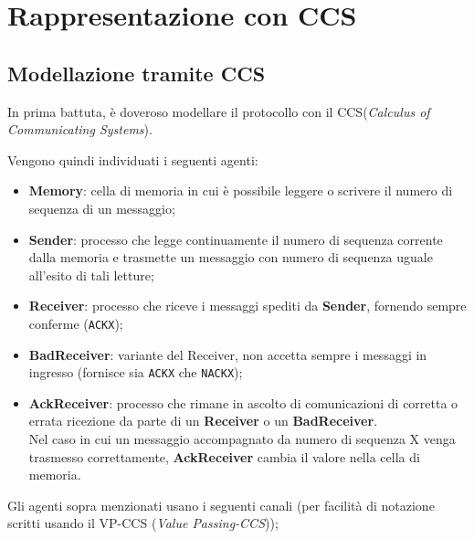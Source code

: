 \newpage{}\section{Rappresentazione con CCS}

\subsection{Modellazione tramite CCS}\label{sec:ccs-model}

In prima battuta, è doveroso modellare il protocollo con il CCS(\emph{Calculus
of Communicating Systems}).

Vengono quindi individuati i seguenti agenti:

\begin{itemize}
\item \textbf{Memory}: cella di memoria in cui è possibile leggere o scrivere
  il numero di sequenza di un messaggio;
\item \textbf{Sender}: processo che legge continuamente il numero di sequenza
  corrente dalla memoria e trasmette un messaggio con numero di sequenza
  uguale all'esito di tali letture;
\item \textbf{Receiver}: processo che riceve i messaggi spediti da
  \textbf{Sender}, fornendo sempre conferme (\texttt{ACKX});
\item \textbf{BadReceiver}: variante del Receiver, non accetta sempre i
  messaggi in ingresso (fornisce sia \texttt{ACKX} che \texttt{NACKX});
\item \textbf{AckReceiver}: processo che rimane in ascolto di comunicazioni di
  corretta o errata ricezione da parte di un \textbf{Receiver} o un
  \textbf{BadReceiver}. \\
  Nel caso in cui un messaggio accompagnato da numero di sequenza X venga
  trasmesso correttamente, \textbf{AckReceiver} cambia il valore nella cella
  di memoria.
\end{itemize}

Gli agenti sopra menzionati usano i seguenti canali (per facilità di notazione
scritti usando il VP-CCS (\emph{Value Passing-CCS}));

